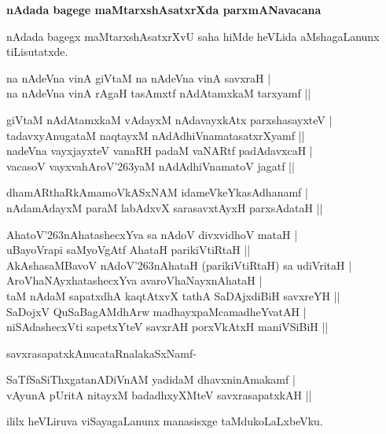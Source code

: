 {\bf nAdada bagege maMtarxshAsatxrXda parxmANavacana}\label{page159}

nAdada bagegx maMtarxshAsatxrXvU saha hiMde heVLida aMshagaLanunx tiLisutatxde.

\begin{shloka}
na nAdeVna vinA giVtaM na nAdeVna vinA savxraH |\\\label{159}
na nAdeVna vinA rAgaH tasAmxtf nAdAtamxkaM tarxyamf ||
\end{shloka}

\begin{shloka}
giVtaM nAdAtamxkaM vAdayxM nAdavayxkAtx parxshasayxteV |\\\label{159}
tadavxyAnugataM naqtayxM nAdAdhiVnamatasatxrXyamf ||\\
nadeVna vayxjayxteV vanaRH padaM vaNARtf padAdavxcaH |\\
vacasoV vayxvahAroV\char'263yaM nAdAdhiVnamatoV jagatf ||
\end{shloka}

\begin{shloka}
dhamARthaRkAmamoVkASxNAM idameVkeYkasAdhanamf |\\\label{159}
nAdamAdayxM paraM labAdxvX sarasavxtAyxH parxsAdataH ||
\end{shloka}

\begin{shloka}
AhatoV\char'263nAhatashecxYva sa nAdoV divxvidhoV mataH |\\\label{159}
uBayoVrapi saMyoVgAtf AhataH parikiVtiRtaH ||\\
AkAshasaMBavoV nAdoV\char'263nAhataH (parikiVtiRtaH) sa udiVritaH |\\
AroVhaNAyxhatashecxYva avaroVhaNayxnAhataH |\\
taM nAdaM sapatxdhA kaqtAtxvX tathA SaDAjxdiBiH savxreYH ||\\
SaDojxV QuSaBagAMdhArw madhayxpaMcamadheYvatAH |\\
niSAdashecxVti sapetxYteV savxrAH porxVkAtxH maniVSiBiH ||
\end{shloka}

savxrasapatxkAnucataRnalakaSxNamf-\label{160}

\begin{shloka}
SaTfSaSiThxgatanADiVnAM yadidaM dhavxninAmakamf |\\
vAyunA pUritA nitayxM badadhxyXMteV savxrasapatxkAH ||
\end{shloka}

ililx heVLiruva viSayagaLanunx manasisxge taMdukoLaLxbeVku.

